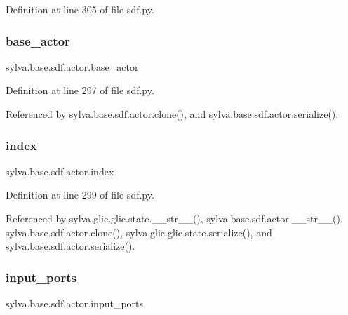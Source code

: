 Definition at line 305 of file sdf.\+py.

\mbox{\label{classsylva_1_1base_1_1sdf_1_1actor_ae9b1e79fcf5e63107ae89ba68ecc4743}} 
\subsubsection{\texorpdfstring{base\+\_\+actor}{base\_actor}}
{\footnotesize\ttfamily sylva.\+base.\+sdf.\+actor.\+base\+\_\+actor}



Definition at line 297 of file sdf.\+py.



Referenced by sylva.\+base.\+sdf.\+actor.\+clone(), and sylva.\+base.\+sdf.\+actor.\+serialize().

\mbox{\label{classsylva_1_1base_1_1sdf_1_1actor_a876d41fa48c3a1a6d62fc3054b321f08}} 
\subsubsection{\texorpdfstring{index}{index}}
{\footnotesize\ttfamily sylva.\+base.\+sdf.\+actor.\+index}



Definition at line 299 of file sdf.\+py.



Referenced by sylva.\+glic.\+glic.\+state.\+\_\+\+\_\+str\+\_\+\+\_\+(), sylva.\+base.\+sdf.\+actor.\+\_\+\+\_\+str\+\_\+\+\_\+(), sylva.\+base.\+sdf.\+actor.\+clone(), sylva.\+glic.\+glic.\+state.\+serialize(), and sylva.\+base.\+sdf.\+actor.\+serialize().

\mbox{\label{classsylva_1_1base_1_1sdf_1_1actor_aad8739c0c518eb7017949d07effee1b2}} 
\subsubsection{\texorpdfstring{input\+\_\+ports}{input\_ports}}
{\footnotesize\ttfamily sylva.\+base.\+sdf.\+actor.\+input\+\_\+ports}



